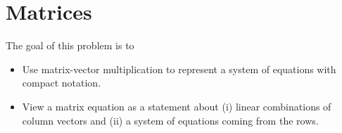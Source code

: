 \documentclass{workbook}
\newcommand{\displayonlynewpage}{\begin{displayonly}\newpage\end{displayonly}}
\newcommand{\bookonlynewpage}{\begin{bookonly}\newpage\end{bookonly}}
\begin{document}
\begin{slide}
	\bookonlynewpage
	\displayonlynewpage
\section*{Matrices}

	\question
	\begin{annotation}
		\begin{goals}

			The goal of this problem is to
			\begin{itemize}
				\item Use matrix-vector multiplication to represent a system of equations
					with compact notation.
				\item View a matrix equation as a statement about (i) linear combinations of column vectors
					and (ii) a system of equations coming from the rows.
			\end{itemize}
		\end{goals}


\end{annotation}
\end{slide}
\end{document}
